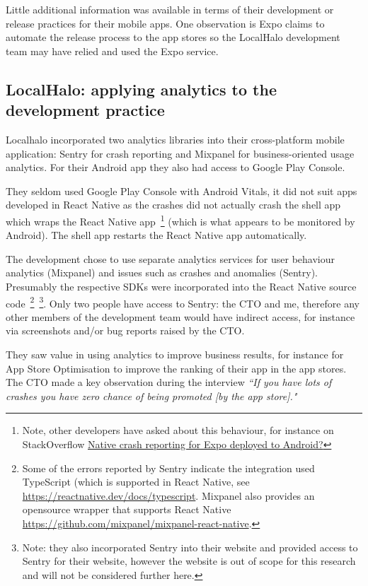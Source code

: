 Little additional information was available in terms of their development or release practices for their mobile apps. One observation is Expo claims to automate the release process to the app stores so the LocalHalo development team may have relied and used the Expo service.

\subsection{LocalHalo: applying analytics to the development practice}
Localhalo incorporated two analytics libraries into their cross-platform mobile application: Sentry for crash reporting and Mixpanel for business-oriented usage analytics. For their Android app they also had access to Google Play Console.

They seldom used Google Play Console with Android Vitals, it did not suit apps developed in React Native as the crashes did not actually crash the shell app which wraps the React Native app~\footnote{Note, other developers have asked about this behaviour, for instance on StackOverflow \href{https://stackoverflow.com/questions/66166824/native-crash-reporting-for-expo-deployed-to-android/}{Native crash reporting for Expo deployed to Android?}} 
(which is what appears to be monitored by Android). The shell app restarts the React Native app automatically.

The development chose to use separate analytics services for user behaviour analytics (Mixpanel) and issues such as crashes and anomalies (Sentry). Presumably the respective SDKs were incorporated into the React Native source code~\footnote{Some of the errors reported by Sentry indicate the integration used TypeScript (which is supported in React Native, see \url{https://reactnative.dev/docs/typescript}. Mixpanel also provides an opensource wrapper that supports React Native \url{https://github.com/mixpanel/mixpanel-react-native}.}~\footnote{Note: they also incorporated Sentry into their website and provided access to Sentry for their website, however the website is out of scope for this research and will not be considered further here.}. Only two people have access to Sentry: the CTO and me, therefore any other members of the development team would have indirect access, for instance via screenshots and/or bug reports raised by the CTO. 

They saw value in using analytics to improve business results, for instance for App Store Optimisation to improve the ranking of their app in the app stores. The CTO made a key observation during the interview \emph{``If you have lots of crashes you have zero chance of being promoted [by the app store]."}

